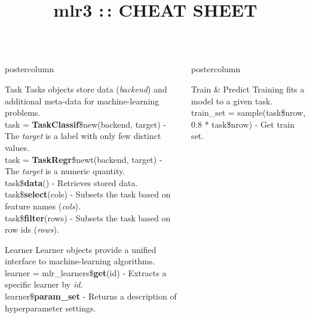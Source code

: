 \documentclass{beamer}
\title{mlr3 :\,: CHEAT SHEET} %
\newlength{\columnheight} %
\begin{document}
\begin{frame}[fragile]{}
\begin{columns}
	\begin{column}{.31\textwidth}
		\begin{beamercolorbox}[center]{postercolumn}
			\begin{minipage}{.98\textwidth}
				\parbox[t][\columnheight]{\textwidth}{				
					\begin{myblock}{Task}
						Tasks objects store data (\textit{backend}) and additional meta-data for machine-learning problems.
						\\[2\baselineskip]
						task = \textbf{TaskClassif}\$new(backend, target) - The \textit{target} is a label with only few distinct values. 
						\\[\baselineskip]
						task = \textbf{TaskRegr}\$newt(backend, target) - The \textit{target} is a numeric quantity.
						\\[\baselineskip]
						task\$\textbf{data}() - Retrieves stored data.
						\\[\baselineskip]
						task\$\textbf{select}(cols) -  Subsets the task based on feature names (\textit{cols}).
						\\[\baselineskip]
						task\$\textbf{filter}(rows) - Subsets the task based on row ids (\textit{rows}).
					\end{myblock}
					\begin{myblock}{Learner}
						Learner objects provide a unified interface to machine-learning algorithms.
						\\[2\baselineskip]
						learner = mlr\_learners\$\textbf{get}(id) - Extracts a specific learner by \textit{id}.
						\\[\baselineskip]
						learner\$\textbf{param\_set} - Returns a description of hyperparameter settings.
					\end{myblock}\vfill
				}
			\end{minipage}
		\end{beamercolorbox}
	\end{column}
	\begin{column}{.31\textwidth}
		\begin{beamercolorbox}[center]{postercolumn}
			\begin{minipage}{.98\textwidth}
				\parbox[t][\columnheight]{\textwidth}{
					\begin{myblock}{Train \& Predict}
						Training fits a model to a given task. 
						\\[2\baselineskip]
						train\_set = sample(task\$nrow, 0.8 * task\$nrow) - Get train set.

\end{myblock}}
\end{minipage}
\end{beamercolorbox}
\end{column}
\end{columns}
\end{frame}
\end{document}
